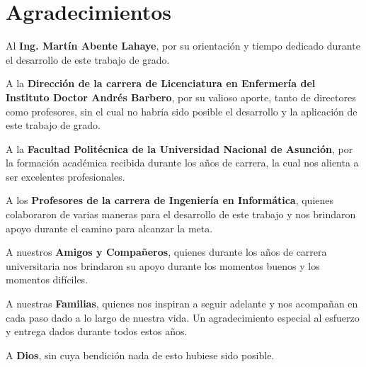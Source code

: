 \chapter*{Agradecimientos}

Al \textbf{Ing. Martín Abente Lahaye}, por su orientación  y tiempo dedicado
durante el desarrollo de este trabajo de grado.

A la \textbf{Dirección de la carrera de Licenciatura en Enfermería del Instituto
    Doctor Andrés Barbero}, por su valioso aporte, tanto de directores como
profesores, sin el cual no habría sido posible el desarrollo y la aplicación de
este trabajo de grado.
 
A la \textbf{Facultad Politécnica de la Universidad Nacional de Asunción}, por
la formación académica recibida durante los años de carrera, la cual nos alienta
a ser excelentes profesionales.

A los \textbf{Profesores de la carrera de Ingeniería en Informática}, quienes
colaboraron de varias maneras para el desarrollo de este trabajo y nos brindaron
apoyo durante el camino para alcanzar la meta.

A nuestros \textbf{Amigos y Compañeros}, quienes durante los años de carrera
universitaria nos brindaron su apoyo durante los momentos buenos y los momentos
difíciles.

A nuestras \textbf{Familias}, quienes nos inspiran a seguir adelante y nos
acompañan en cada paso dado a lo largo de nuestra vida. Un agradecimiento
especial al esfuerzo y entrega dados durante todos estos años.

A \textbf{Dios}, sin cuya bendición nada de esto hubiese sido posible.
